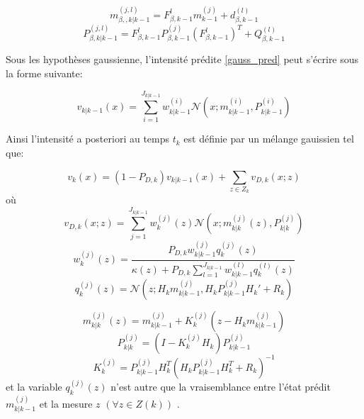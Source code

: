 \documentclass[10pt,french,a4paper]{report}
\begin{document}
\begin{equation}
m_{\beta,,k|k-1}^{(j,l)}= F_{\beta ,k-1}^l  m_{k-1}^{(j)} + d_{\beta,k-1}^{(l)}
\end{equation}
\begin{equation}
P_{\beta,k|k-1}^{(j,l)}=F_{\beta ,k-1}^l    P_{\beta,k-1}^{(j)} ( F_{\beta ,k-1}^l )^T + Q_{\beta,k-1}^{(l)}
\end{equation}
 
 
Sous les hypothèses gaussienne, l'intensité prédite \ref{gauss_pred} peut s'écrire sous la forme suivante:
 
\begin{equation}
\label{gauss_surv2}
v_{k|k-1}(x)=     \sum\limits_{i=1}^{J_{k|k-1}}w_{k|k-1}^{(i)}\mathcal{N}\left(x;m_{k|k-1}^{(i)},P_{k|k-1}^{(i)} \right) 
\end{equation}
 
 Ainsi l'intensité a posteriori au temps $t_k$ est définie par un mélange gauissien tel que:
 
 \begin{equation}
\label{gauss_posteriori}
v_{k}(x)=  (1-P_{D,k})v_{k|k-1}(x)  + \sum\limits_{z\in Z_k} v_{D,k}(x;z) 
\end{equation}
où
 \begin{equation}
v_{D,k}(x;z) =  \sum\limits_{j=1}^{J_{k|k-1}}w_{k}^{(j)}(z)\mathcal{N}\left(x;m_{k|k}^{(j)}(z),P_{k|k}^{(j)} \right) 
\end{equation}
\begin{equation}
w_{k}^{(j)}(z)= \frac{P_{D,k}w^{(j)}_{k|k-1}q_k^{(j)}(z)}{\kappa (z)+P_{D,k} \sum\limits_{l=1}^{J_{k|k-1}}w^{(l)}_{k|k-1}q_k^{(l)}(z)}
\end{equation}
 \begin{equation}
 q_k^{(j)}(z) = \mathcal{N}\left(z;H_k m_{k|k-1}^{(j)},H_k P_{k|k-1}^{(j)}H_k '+ R_k\right)
 \label{m_vraisemblance}
\end{equation}

\begin{equation}
m_{k|k}^{(j)}(z) = m_{k|k-1}^{(j)}+K_k^{(j)}(z-H_k m_{k|k-1}^{(j)})
\label{m_etatestime}
\end{equation}
  \begin{equation}
P_{k|k}^{(j)}=(I-K_k^{(j)}H_k)P_{k|k-1}^{(j)}
\label{m_covarianceestimee}
 \end{equation}
  \begin{equation}
K_k^{(j)}= P_{k|k-1}^{(j)}H_k^T(H_kP_{k|k-1}^{(j)}H_k^T+R_k)^{-1}
 \end{equation}
et la variable $q_k^{(j)}(z)$ n'est autre que la vraisemblance entre l'état prédit $m_{k|k-1}^{(j)}$ et la mesure $z$ $(\forall z \in Z(k))$ .
 \\
 
\end{document}

